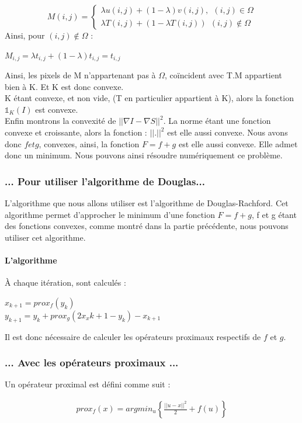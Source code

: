 \begin{equation*} 
M (i,j) = 
\left\{
\begin{aligned}
\lambda u(i,j) +(1-\lambda) v(i,j), \ \ (i,j) \in \Omega\\
\lambda T(i,j) +(1-\lambda T(i,j))  \ \ (i,j)\notin \Omega
\end{aligned}
\right.
\end{equation*}
Ainsi, pour $(i,j) \notin \Omega$ : \\
\begin{center}
$M_{i,j} = \lambda t_{i,j}+(1-\lambda) t_{i,j} = t_{i,j}$
\end{center}
Ainsi, les pixels de M n'appartenant pas à $\Omega$, coïncident avec T.M appartient bien à K. Et K est donc convexe.\\
K étant convexe, et non vide, (T en particulier appartient à K), alors la fonction $\mathbb{1}_K(I)$ est convexe. \\
Enfin montrons la convexité de $||\nabla I-\nabla S||^2$.
La norme étant une fonction convexe et croissante, alors la fonction : $||.||^2$ est elle aussi convexe. 
Nous avons donc $f et g$, convexes, ainsi, la fonction $F =f+g$ est elle aussi convexe. Elle admet donc un minimum. Nous pouvons ainsi résoudre numériquement ce problème.
\subsubsection{... Pour utiliser l'algorithme de Douglas...}
L'algorithme que nous allons utiliser est l'algorithme de Douglas-Rachford. Cet algorithme permet d'approcher le minimum  d'une fonction $F = f+g$, f et g étant des fonctions convexes, comme montré dans la partie précédente, nous pouvons utiliser cet algorithme.
\paragraph{L'algorithme}
À chaque itération, sont calculés : 
\begin{center}
$x_{k+1} = prox_f(y_k)$\\
$y_{k+1} = y_k+prox_g(2x_x{k+1}-y_k)-x_{k+1}$
\end{center}{}
Il est donc nécessaire de calculer les opérateurs proximaux respectifs de $f$ et $g$. 
\subsubsection{... Avec les opérateurs proximaux ...}
Un opérateur proximal est défini comme suit : 
\begin{center}
\begin{equation*}
\begin{aligned}
prox_f(x) = argmin_u \left\{ \frac{||u-x||^2}{2}+ f(u)\right\}
\end{aligned}
\end{equation*}
\end{center}
